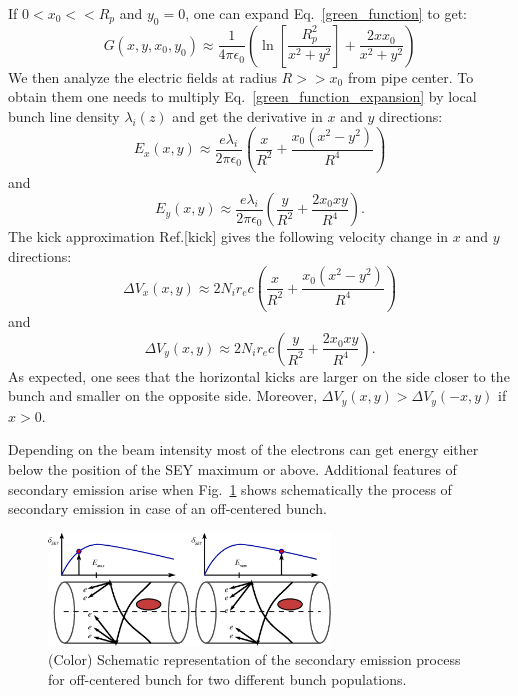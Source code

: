 \documentclass[1p]{elsarticle}%
\begin{document}
	If $0<x_{0}<<R_{p}$ and $y_{0}=0$, one can expand Eq.~\ref{green_function} to get:
\begin{equation}\label{green_function_expansion}
G(x,y,x_{0},y_{0}) \approx \frac{1}{4 \pi \epsilon_{0}} 
\left (
\ln \left [ \frac{R^{2}_{p}}{x^{2}+y^2} \right ]
+
\frac{2 x x_{0}}{x^{2}+y^{2}}
\right )
\end{equation}
	We then analyze the electric fields at radius $R>>x_{0}$ from pipe center. 
	To obtain them one needs to multiply Eq.~\ref{green_function_expansion} by local bunch line density $\lambda_{i}(z)$ and get the derivative in $x$ and $y$ directions:
\begin{equation}\label{green_function_expansion}
E_{x}(x,y) \approx \frac{e \lambda_{i}}{2 \pi \epsilon_{0}}
\left (
\frac{x}{R^{2}}+\frac{x_{0} (x^{2}-y^{2})}{R^{4}}
\right ) 
\end{equation}
and
\begin{equation}\label{green_function_expansion}
E_{y}(x,y) \approx \frac{e \lambda_{i}}{2 \pi \epsilon_{0}}
\left (
\frac{y}{R^{2}}+\frac{2 x_{0} x y}{R^{4}}
\right ).
\end{equation}
The kick approximation Ref.[kick] gives the following velocity change in $x$ and $y$ directions:
\begin{equation}\label{green_function_expansion}
\Delta V_{x}(x,y) \approx 2 N_{i} r_{e} c
\left (
\frac{x}{R^{2}}+\frac{x_{0} (x^{2}-y^{2})}{R^{4}}
\right ) 
\end{equation}
and
\begin{equation}\label{green_function_expansion}
\Delta V_{y}(x,y) \approx 2 N_{i} r_{e} c
\left (
\frac{y}{R^{2}}+\frac{2 x_{0} x y}{R^{4}}
\right ).
\end{equation}
As expected, one sees that the horizontal kicks are larger on the side closer to the bunch and smaller on the opposite side.
Moreover, $\Delta V_{y}(x,y)>\Delta V_{y}(-x,y)$ if $x>0$.

Depending on the beam intensity most of the electrons can get energy either below the position of the SEY maximum or above.
Additional features of secondary emission arise when
Fig.~\ref{fig:set_difference} shows schematically the process of secondary emission in case of an off-centered bunch.
 

\begin{figure}[htb] 
\centering
\includegraphics*[width=75mm]{./data/two_sey_kicks.eps}
\caption{(Color) Schematic representation of the secondary emission process for off-centered bunch for two different bunch populations.}
\label{fig:set_difference}
\end{figure}
\end{document}
